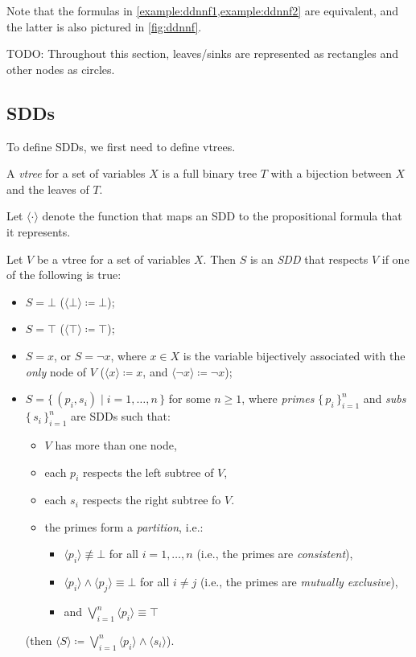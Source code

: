 Note that the formulas in \cref{example:ddnnf1,example:ddnnf2} are equivalent, and the latter is also pictured in \cref{fig:ddnnf}.

TODO: Throughout this section, leaves/sinks are represented as rectangles and other nodes as circles. 

\subsection{SDDs}

To define SDDs, we first need to define vtrees.

\begin{definition}
  A \emph{vtree} for a set of variables $X$ is a full binary tree $T$ with a bijection between $X$ and the leaves of $T$.
\end{definition}

Let $\langle\cdot\rangle$ denote the function that maps an SDD to the propositional formula that it represents.

\begin{definition}
  Let $V$ be a vtree for a set of variables $X$. Then $S$ is an \emph{SDD} that respects $V$ if one of the following is true:
  \begin{itemize}
  \item $S = \bot$ ($\langle \bot \rangle \coloneqq \bot$);
  \item $S = \top$ ($\langle \top \rangle \coloneqq \top$);
  \item $S = x$, or $S = \neg x$, where $x \in X$ is the variable bijectively associated with the \emph{only} node of $V$ ($\langle x \rangle \coloneqq x$, and $\langle \neg x \rangle \coloneqq \neg x$);
  \item $S = \{\, (p_i, s_i) \mid i = 1, \dots, n \,\}$ for some $n \ge 1$, where \emph{primes} $\{\,p_i\,\}_{i=1}^n$ and \emph{subs} $\{\,s_i\,\}_{i=1}^n$ are SDDs such that:
    \begin{itemize}
    \item $V$ has more than one node,
    \item each $p_i$ respects the left subtree of $V$,
    \item each $s_i$ respects the right subtree fo $V$.
    \item the primes form a \emph{partition}, i.e.:
      \begin{itemize}
      \item $\langle p_i \rangle \not\equiv \bot$ for all $i = 1, \dots, n$ (i.e., the primes are \emph{consistent}),
      \item $\langle p_i \rangle \land \langle p_j \rangle \equiv \bot$ for all $i \ne j$ (i.e., the primes are \emph{mutually exclusive}),
      \item and $\bigvee_{i=1}^n \langle p_i \rangle \equiv \top$
      \end{itemize}
    \end{itemize}
    (then $\langle S \rangle \coloneqq \bigvee_{i=1}^n \langle p_i \rangle \land \langle s_i \rangle$).
  \end{itemize}
\end{definition}

